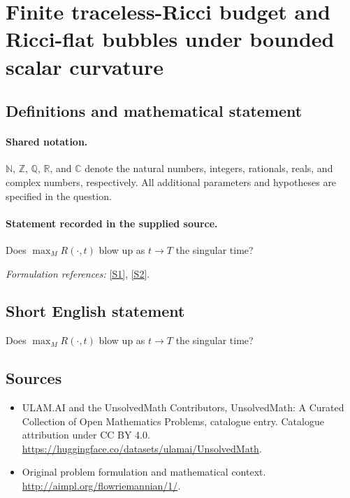 \documentclass[11pt]{article}
\newcommand{\sref}[2]{\hyperlink{source:#1:#2}{[S#2]}}
\begin{document}
\section{Finite traceless-Ricci budget and Ricci-flat bubbles under bounded scalar curvature}\label{statement}

\subsection{Definitions and mathematical statement}

\paragraph{Shared notation.}$\mathbb N$, $\mathbb Z$, $\mathbb Q$, $\mathbb R$, and $\mathbb C$ denote the natural numbers, integers, rationals, reals, and complex numbers, respectively. All additional parameters and hypotheses are specified in the question.


\paragraph{Statement recorded in the supplied source.}
Does $\max_M R(\cdot,t)$ blow up as $t\to T$ the singular time?
\par\smallskip\textit{Formulation references:} \sref{statement}{1}, \sref{statement}{2}.
\subsection{Short English statement}
Does $\max_M R(\cdot,t)$ blow up as $t\to T$ the singular time?
\subsection{Sources}
\begin{itemize}
\item[\hypertarget{source:statement:1}{S1}] ULAM.AI and the UnsolvedMath Contributors, UnsolvedMath: A Curated Collection of Open Mathematics Problems, catalogue entry. Catalogue attribution under CC BY 4.0.
\url{https://huggingface.co/datasets/ulamai/UnsolvedMath}.
\item[\hypertarget{source:statement:2}{S2}] Original problem formulation and mathematical context.
\url{http://aimpl.org/flowriemannian/1/}.
\end{itemize}
\label{end:statement}
\end{document}
